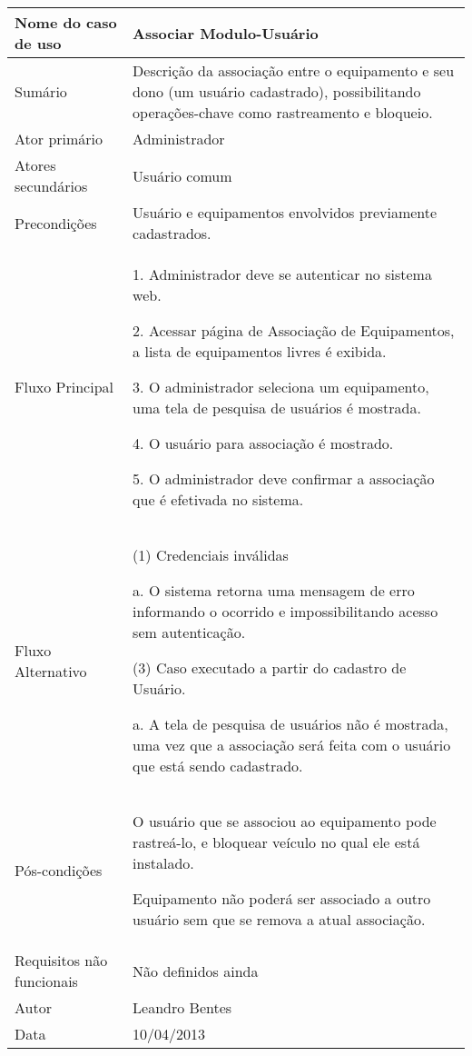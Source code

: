 \begin{flushleft}
\tablefirsthead{}
\tablehead{}
\tabletail{}
\tablelasttail{}
\begin{supertabular}{|m{5.5680003cm}|m{9.325cm}|}
\hline
Nome do caso de uso &
Associar Modulo-Usuário\\\hline
Sumário &
Descrição da associação entre o equipamento e seu dono (um usuário cadastrado), possibilitando operações-chave como rastreamento e bloqueio. \\\hline
Ator primário &
Administrador\\\hline
Atores secundários &
Usuário comum\\\hline
Precondições &
Usuário e equipamentos envolvidos previamente cadastrados.\\\hline
Fluxo Principal &
1. Administrador deve se autenticar no sistema web.

2. Acessar página de Associação de Equipamentos, a lista de equipamentos livres é exibida.

3. O administrador seleciona um equipamento, uma tela de pesquisa de usuários é mostrada.

4. O usuário para associação é mostrado.

5. O administrador deve confirmar a associação que é efetivada no sistema.\\\hline
Fluxo Alternativo &
(1) Credenciais inválidas

a. O sistema retorna uma mensagem de erro informando o ocorrido e impossibilitando acesso sem autenticação.

(3) Caso executado a partir do cadastro de Usuário.

a. A tela de pesquisa de usuários não é mostrada, uma vez que a associação será feita com o usuário que está sendo cadastrado. \\\hline
Pós-condições &
O usuário que se associou ao equipamento pode rastreá-lo, e bloquear veículo no qual ele está instalado.

Equipamento não poderá ser associado a outro usuário sem que se remova a atual associação.\\\hline
Requisitos não funcionais &
Não definidos ainda\\\hline
Autor &
Leandro Bentes\\\hline
Data &
10/04/2013\\\hline
\end{supertabular}
\end{flushleft}

